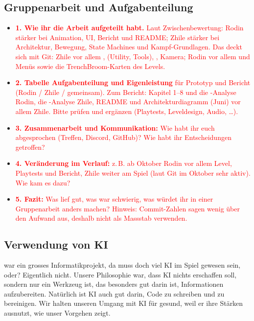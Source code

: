 \documentclass[../Main.tex]{subfiles}
\begin{document}
\subsection{Gruppenarbeit und Aufgabenteilung}

\begin{itemize}[leftmargin=1.5cm]
    \item \textcolor{red}{\textbf{1. Wie ihr die Arbeit aufgeteilt habt.} Laut Zwischenbewertung: Rodin stärker bei Animation, UI, Bericht und README; Zhile stärker bei Architektur, Bewegung, State Machines und Kampf-Grundlagen. Das deckt sich mit Git: Zhile vor allem ,  (Utility, Tools), , Kamera; Rodin vor allem  und Menüs sowie die TrenchBroom-Karten des Levels.}
    \item \textcolor{red}{\textbf{2. Tabelle Aufgabenteilung und Eigenleistung} für Prototyp und Bericht (Rodin / Zhile / gemeinsam). Zum Bericht: Kapitel 1--8 und die -Analyse Rodin, die -Analyse Zhile, README und Architekturdiagramm (Juni) vor allem Zhile. Bitte prüfen und ergänzen (Playtests, Leveldesign, Audio, \ldots).}
    \item \textcolor{red}{\textbf{3. Zusammenarbeit und Kommunikation:} Wie habt ihr euch abgesprochen (Treffen, Discord, GitHub)? Wie habt ihr Entscheidungen getroffen?}
    \item \textcolor{red}{\textbf{4. Veränderung im Verlauf:} z.\,B. ab Oktober Rodin vor allem Level, Playtests und Bericht, Zhile weiter am Spiel (laut Git im Oktober sehr aktiv). Wie kam es dazu?}
    \item \textcolor{red}{\textbf{5. Fazit:} Was lief gut, was war schwierig, was würdet ihr in einer Gruppenarbeit anders machen? Hinweis: Commit-Zahlen sagen wenig über den Aufwand aus, deshalb nicht als Massstab verwenden.}
\end{itemize}

\subsection{Verwendung von KI} \label{sec:ReflexionKI}

 war ein grosses Informatikprojekt, da muss doch viel KI im Spiel gewesen sein, oder? Eigentlich nicht. Unsere Philosophie war, dass KI nichts erschaffen soll, sondern nur ein Werkzeug ist, das besonders gut darin ist, Informationen aufzubereiten. Natürlich ist KI auch gut darin, Code zu schreiben und zu bereinigen. Wir halten unseren Umgang mit KI für gesund, weil er ihre Stärken ausnutzt, wie unser Vorgehen zeigt.
\end{document}
